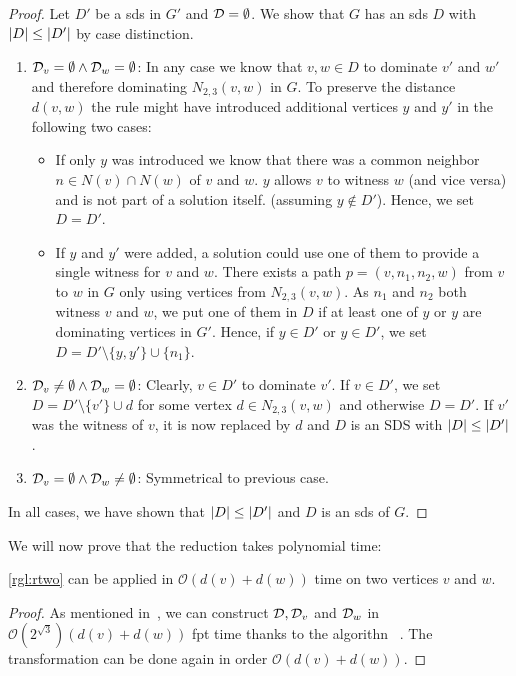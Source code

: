 \begin{proof}
    Let $D'$ be a sds in $G'$ and $\mathcal{D} =  \emptyset$. 
    We show that $G$ has an sds $D$ with $\abs{D} \leq \abs{D'}$ by case distinction. 
    \begin{enumerate}
        \item  $\mathcal{D}_{v} = \emptyset \wedge \mathcal{D}_{w} = \emptyset$: In any case we know that $v,w \in D$ to dominate $v'$ and $w'$ and therefore dominating $N_{2,3}(v,w)$ in $G$. 
        To preserve the distance $d(v,w)$ the rule might have introduced additional vertices $y$ and $y'$ in the following two cases:            
        \begin{itemize}
            \item If only $y$ was introduced we know that there was a common neighbor $n \in N(v) \cap N(w)$ of $v$ and $w$. $y$ allows $v$ to witness $w$ (and vice versa) and is not part of a solution itself. (assuming $y \notin D'$). Hence, we set $D = D'$.
            \item If $y$ and $y'$ were added, a solution could use one of them to provide a single witness for $v$ and $w$. There exists a path $p = (v, n_1, n_2, w)$ from $v$ to $w$ in $G$ only using vertices from $N_{2,3}(v,w)$. As $n_1$ and $n_2$ both witness $v$ and $w$, we put one of them in $D$ if at least one of $y$ or $y$ are dominating vertices in $G'$.
            Hence, if $y \in D'$ or $y \in D'$, we set $D = D' \setminus \{y,y'\} \cup \{n_1\}$.
        \end{itemize}
        \item  $\mathcal{D}_{v} \neq \emptyset \wedge \mathcal{D}_{w} = \emptyset$: Clearly, $v \in D'$ to dominate $v'$. If $v \in D'$, we set $D =  D' \setminus \{v'\} \cup d$ for some vertex $d \in N_{2,3}(v,w)$ and otherwise $D = D'$. If $v'$ was the witness of $v$, it is now replaced by $d$ and $D$ is an SDS with $\abs{D} \leq \abs{D'}$.
        \item  $\mathcal{D}_{v} = \emptyset \wedge \mathcal{D}_{w} \neq \emptyset$: Symmetrical to previous case.
    \end{enumerate} 
    In all cases, we have shown that $\abs{D} \leq \abs{D'}$ and $D$ is an sds of $G$.

\end{proof}

We will now prove that the reduction takes polynomial time:

\begin{corollary}\label{complex:rtwo}
\cref{rgl:rtwo} can be applied in $\mathcal{O}(d(v) + d(w))$ time on two vertices $v$ and $w$.
\end{corollary}
\begin{proof}
As mentioned in~\cite{Garnero2018}, we can construct $\mathcal{D}, \mathcal{D}_{v}$ and $\mathcal{D}_{w}$ in $\mathcal{O}(2^{\sqrt{3}})(d(v) + d(w))$ fpt time thanks to the algorithn \pdomp~\cite{Alber2002}.
The transformation can be done again in order $\mathcal{O}(d(v) + d(w))$.
\end{proof}

